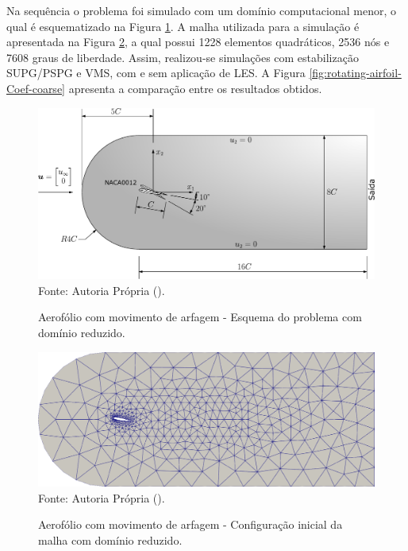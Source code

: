 \newpage
Na sequência o problema foi simulado com um domínio computacional menor, o qual é esquematizado na Figura \ref{fig:rotating-airfoil-coarse}. A malha utilizada para a simulação é apresentada na Figura \ref{fig:mesh-coarse2}, a qual possui 1228 elementos quadráticos, 2536 nós e 7608 graus de liberdade. Assim, realizou-se simulações com estabilização SUPG/PSPG e VMS, com e sem aplicação de LES. A Figura \ref{fig:rotating-airfoil-Coef-coarse} apresenta a comparação entre os resultados obtidos.

\begin{figure}[h!]
    \centering
    \caption{Aerofólio com movimento de arfagem - Esquema do problema com domínio reduzido.}
    \includegraphics[width=.8\linewidth]{Figuras/rotating-airfoil/NACA0012-Moving-Coarse.pdf}
    \\Fonte: Autoria Própria (\the\year).
    \label{fig:rotating-airfoil-coarse}
\end{figure}

\begin{figure}[h!]
    \centering
    \caption{Aerofólio com movimento de arfagem - Configuração inicial da malha com domínio reduzido.}
    \includegraphics[width=.75\linewidth]{Figuras/rotating-airfoil/mesh-coarse2.png}
    \\Fonte: Autoria Própria (\the\year).
    \label{fig:mesh-coarse2}
\end{figure}
